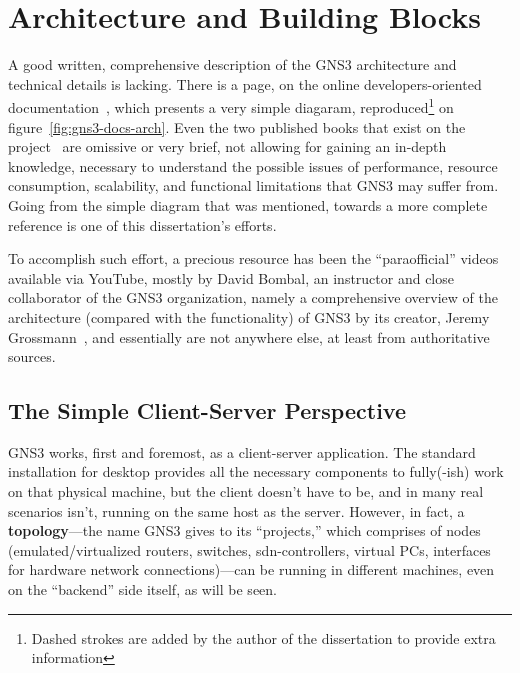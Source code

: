 \section{Architecture and Building Blocks}
\label{sec:gns3architecture}

A good written, comprehensive description of the GNS3 architecture and technical details is lacking.
There is a page, on the online developers-oriented documentation~\cite{gns3devarch}, which presents a very simple diagaram, reproduced\footnote{Dashed strokes are added by the author of the dissertation to provide extra information} on figure~\ref{fig:gns3-docs-arch}.
Even the two published books that exist on the project~\cite{gns3netsimguide,thebookofgns3} are omissive or very brief, not allowing for gaining an in-depth knowledge, necessary to understand the possible issues of performance, resource consumption, scalability, and functional limitations that GNS3 may suffer from.
Going from the simple diagram that was mentioned, towards a more complete reference is one of this dissertation's efforts.

To accomplish such effort, a precious resource has been the ``paraofficial'' videos available via YouTube, mostly by David Bombal, an instructor and close collaborator of the GNS3 organization, namely a comprehensive overview of the architecture (compared with the functionality) of GNS3 by its creator, Jeremy Grossmann~\cite{ytgns3arch22}, and essentially are not anywhere else, at least from authoritative sources. %



\subsection{The Simple Client-Server Perspective}
\label{subsec:gns3clientserver}

GNS3 works, first and foremost, as a client-server application.
The standard installation for desktop provides all the necessary components to fully(-ish) work on that physical machine, but the client doesn't have to be, and in many real scenarios isn't, running on the same host as the server.
However, in fact, a \textbf{topology}---the name GNS3 gives to its ``projects,'' which comprises of nodes (emulated/virtualized routers, switches, \gls{sdn}-controllers, virtual PCs, interfaces for hardware network connections)---can be running in different machines, even on the ``backend'' side itself, as will be seen.

